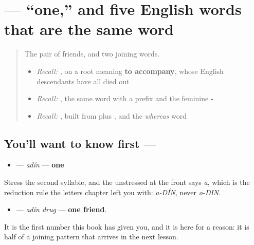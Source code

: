 \section[\texorpdfstring{\ru{один} (adín)}{один (adín)}]{ — \textquotedblleft{}one,\textquotedblright{} and five English words that are the same word}

\label{lesson:RU-C17-odin}



\begin{quote}
The pair of friends, and two joining words.

\begin{itemize}
\raggedright
  \item \emph{Recall:} \emph{}, on a root meaning \textbf{to accompany}, whose English descendants have all died out
  \item \emph{Recall:} \emph{}, the same word with a prefix and the feminine \textbf{-}
  \item \emph{Recall:} \emph{}, built from \textbf{} plus \textbf{}, and \emph{} the \emph{whereas} word
\end{itemize}
\end{quote}

\subsection*{You'll want to know first — }
\begin{itemize}
\raggedright
  \item \textbf{} — \emph{adín} — \textbf{one}
\end{itemize}

Stress the second syllable, and the unstressed \textbf{} at the front says \emph{a}, which is the reduction rule the letters chapter left you with: \emph{a-DÍN}, never \emph{o-DIN}.

\begin{itemize}
\raggedright
  \item \textbf{ } — \emph{adín drug} — \textbf{one friend}.
\end{itemize}

It is the first number this book has given you, and it is here for a reason: it is half of a joining pattern that arrives in the next lesson.

